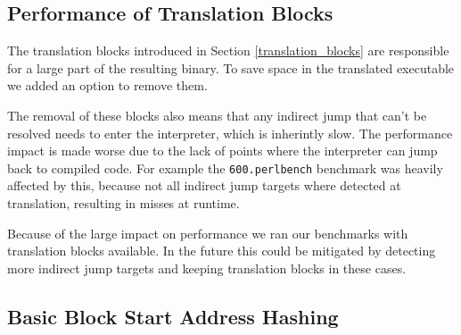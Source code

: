 \documentclass[course=eragp]{aspdoc}
\begin{document}
\subsection{Performance of Translation Blocks}\label{sec:translation_blocks}

The translation blocks introduced in Section \ref{translation_blocks} are responsible for a large part of the resulting binary.
To save space in the translated executable we added an option to remove them.

\par

The removal of these blocks also means that any indirect jump that can't be resolved needs to enter the interpreter,
which is inherintly slow.
The performance impact is made worse due to the lack of points where the interpreter can jump back to compiled code.
For example the \texttt{600.perlbench} benchmark was heavily affected by this, because not all indirect jump targets
where detected at translation, resulting in misses at runtime.

\par

Because of the large impact on performance we ran our benchmarks with translation blocks available.
In the future this could be mitigated by detecting more indirect jump targets and keeping translation blocks in
these cases.

\subsection{Basic Block Start Address Hashing}
\end{document}
